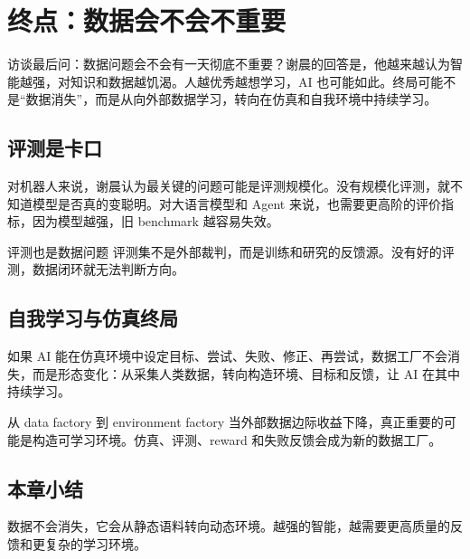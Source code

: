 \section{终点：数据会不会不重要}

访谈最后问：数据问题会不会有一天彻底不重要？谢晨的回答是，他越来越认为智能越强，对知识和数据越饥渴。人越优秀越想学习，AI 也可能如此。终局可能不是“数据消失”，而是从向外部数据学习，转向在仿真和自我环境中持续学习。

\subsection{评测是卡口}

对机器人来说，谢晨认为最关键的问题可能是评测规模化。没有规模化评测，就不知道模型是否真的变聪明。对大语言模型和 Agent 来说，也需要更高阶的评价指标，因为模型越强，旧 benchmark 越容易失效。

\begin{importantbox}{评测也是数据问题}
评测集不是外部裁判，而是训练和研究的反馈源。没有好的评测，数据闭环就无法判断方向。
\end{importantbox}

\subsection{自我学习与仿真终局}

如果 AI 能在仿真环境中设定目标、尝试、失败、修正、再尝试，数据工厂不会消失，而是形态变化：从采集人类数据，转向构造环境、目标和反馈，让 AI 在其中持续学习。

\begin{knowledgebox}{从 data factory 到 environment factory}
当外部数据边际收益下降，真正重要的可能是构造可学习环境。仿真、评测、reward 和失败反馈会成为新的数据工厂。
\end{knowledgebox}

\subsection{本章小结}

数据不会消失，它会从静态语料转向动态环境。越强的智能，越需要更高质量的反馈和更复杂的学习环境。


